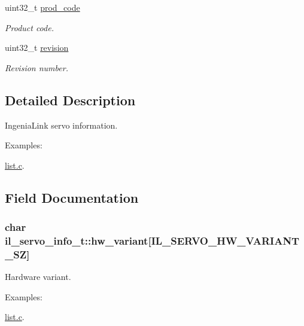 \begin{DoxyCompactItemize}
uint32\+\_\+t \hyperlink{structil__servo__info__t_a5faaa1ff2b81386dfe159650ba85a0be}{prod\+\_\+code}
\begin{DoxyCompactList}\small\item\em Product code. \end{DoxyCompactList}\item 
uint32\+\_\+t \hyperlink{structil__servo__info__t_abfec53fe057b8a4a5fa79d02be777643}{revision}
\begin{DoxyCompactList}\small\item\em Revision number. \end{DoxyCompactList}\end{DoxyCompactItemize}


\subsection{Detailed Description}
Ingenia\+Link servo information. 

\begin{Desc}
\item[Examples\+: ]\par
\hyperlink{list_8c-example}{list.\+c}.\end{Desc}


\subsection{Field Documentation}
\subsubsection[{\texorpdfstring{hw\+\_\+variant}{hw_variant}}]{\setlength{\rightskip}{0pt plus 5cm}char il\+\_\+servo\+\_\+info\+\_\+t\+::hw\+\_\+variant\mbox{[}{\bf I\+L\+\_\+\+S\+E\+R\+V\+O\+\_\+\+H\+W\+\_\+\+V\+A\+R\+I\+A\+N\+T\+\_\+\+SZ}\mbox{]}}\hypertarget{structil__servo__info__t_abd47e38a9b25fd17f1dfb09341a83c93}{}\label{structil__servo__info__t_abd47e38a9b25fd17f1dfb09341a83c93}


Hardware variant. 

\begin{Desc}
\item[Examples\+: ]\par
\hyperlink{list_8c-example}{list.\+c}.\end{Desc}
